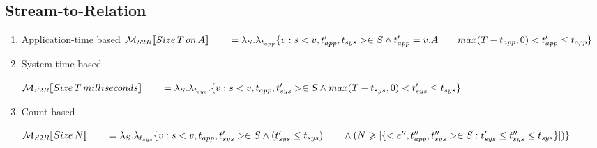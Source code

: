 \subsection*{Stream-to-Relation}
\begin{enumerate}
	\item Application-time based
	$\mathcal{M}_{S2R}[\![Size\, T\, on\, A]\!] \\
		{}\qquad= \lambda_S.\lambda_{t_{app}}\{v:  s<v,t_{app}',t_{sys}> \in S  \land t'_{app} = v.A \\
		{}\qquad max(T-t_{app},0) < t'_{app} \leq t_{app} \}$ 
		
	\item System-time based
	
	$\mathcal{M}_{S2R}[\![Size\, T\, milliseconds]\!] \\
		{}\qquad= \lambda_S.\lambda_{t_{sys}}.\{v:  s<v,t_{app},t'_{sys}> \in S  \land 
		max(T-t_{sys},0) < t'_{sys} \leq t_{sys} \}$ 
		
	\item Count-based
	
	$\mathcal{M}_{S2R}[\![Size\, N]\!] \\
		{}\qquad= \lambda_S.\lambda_{t_{sys}}\{v:  s<v,t_{app},t'_{sys}> \in S  \land (t'_{sys} \leq t_{sys}) \\
		{}\qquad \land (N \geqslant |\{<e'',t''_{app},t''_{sys}> \in S: t'_{sys} \leq t''_{sys} \leq t_{sys}\}|) \}$
\end{enumerate}

